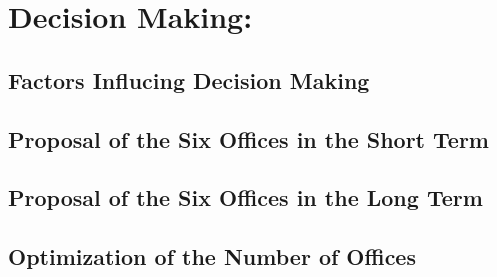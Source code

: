 \MinParskip{}

\section{Decision Making: }

\subsection{Factors Influcing Decision Making}


\subsection{Proposal of the Six Offices in the Short Term}


\subsection{Proposal of the Six Offices in the Long Term}

\subsection{Optimization of the Number of Offices}







